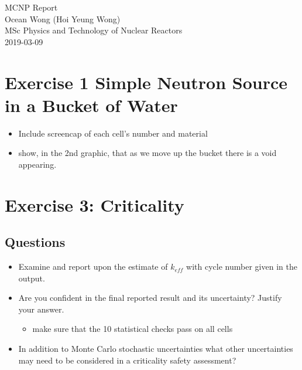 \documentclass[a4paper, 12pt]{article}
\begin{document}
\begin{center}
MCNP Report										\\
Ocean Wong (Hoi Yeung Wong)						\\
MSc Physics and Technology of Nuclear Reactors	\\
2019-03-09 										\\
\end{center}

\section{Exercise 1 Simple Neutron Source in a Bucket of Water}
\begin{itemize}
	\item Include screencap of each cell's number and material
	\item show, in the 2nd graphic, that as we move up the bucket there is a void appearing.
\end{itemize}
\section{Exercise 3: Criticality}
\subsection{Questions}
\begin{itemize}
	\item Examine and report upon the estimate of $k_{eff}$ with cycle number given in the output.
	\item Are you confident in the final reported result and its uncertainty? Justify your answer.
	\begin{itemize}
		\item make sure that the 10 statistical checks pass on all cells
	\end{itemize}
	\item In addition to Monte Carlo stochastic uncertainties what other uncertainties may need 
	to be considered in a criticality safety assessment?
\end{itemize}
\end{document}
